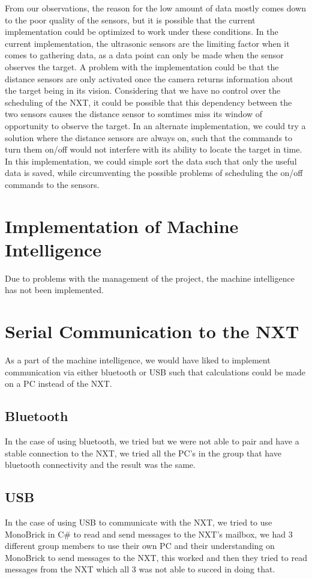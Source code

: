 From our observations, the reason for the low amount of data mostly comes down
to the poor quality of the sensors, but it is possible that the current
implementation could be optimized to work under these conditions. In the current
implementation, the ultrasonic sensors are the limiting factor when it comes to
gathering data, as a data point can only be made when the sensor observes the
target.\nl
A problem with the implementation could be that the distance sensors are only
activated once the camera returns information about the target being in its
vision. Considering that we have no control over the scheduling of the NXT, it
could be possible that this dependency between the two sensors causes the
distance sensor to somtimes miss its window of opportunity to observe the
target.\nl
In an alternate implementation, we could try a solution where the distance
sensors are always on, such that the commands to turn them on/off would not
interfere with its ability to locate the target in time. In this implementation,
we could simple sort the data such that only the useful data is saved, while
circumventing the possible problems of scheduling the on/off commands to the
sensors.

\section{Implementation of Machine Intelligence}
Due to problems with the management of the project, the machine intelligence has
not been implemented.

\section{Serial Communication to the NXT}
As a part of the machine intelligence, we would have liked to implement
communication via either bluetooth or USB such that calculations could be made
on a PC instead of the NXT.

\subsection{Bluetooth}
In the case of using bluetooth, we tried but we were not able to pair and
have a stable connection to the NXT, we tried all the PC's in the group that
have bluetooth connectivity and the result was the same.

\subsection{USB}
In the case of using USB to communicate with the NXT, we tried to use MonoBrick
\cite{MonoBrick} in C\# to read and send messages to the NXT's mailbox, we had 3
different group members to use their own PC and their understanding on MonoBrick
to send messages to the NXT, this worked and then they tried to read messages
from the NXT which all 3 was not able to succed in doing that. 
 


